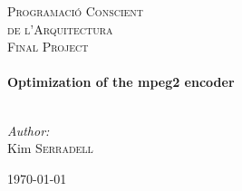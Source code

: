 
\begin{titlepage}
\begin{center}

\bigskip



\textsc{\LARGE Programació Conscient}\\[0.2cm]
\textsc{\LARGE de l'Arquitectura}\\[1.5cm]
\textsc{\Large Final Project}\\[0.5cm]


\HRule \\[0.4cm]
{ \huge \bfseries Optimization of the mpeg2 encoder}\\[0.4cm]

\HRule \\[1.5cm]

\end{center}

\begin{minipage}{0.4\textwidth}
\begin{flushleft} \large
\emph{Author:}\\
Kim \textsc{Serradell}\\
\end{flushleft}
\end{minipage}

\vfill
\begin{center}
{\large \today}
\end{center}


\end{titlepage}